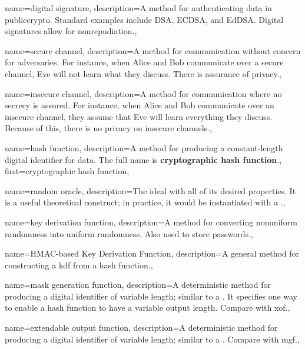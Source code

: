 {
    name={digital signature},
    description={A method for authenticating data in \gls{publiccrypto}.
        Standard examples include DSA, ECDSA, and EdDSA.
        Digital signatures allow for nonrepudiation.},
}

{
    name={secure channel},
    description={A method for communication without concern for adversaries.
        For instance, when Alice and Bob communicate over a secure channel,
        Eve will not learn what they discuss.
        There is assurance of privacy.},
}

{
    name={insecure channel},
    description={A method for communication where no secrecy is assured.
        For instance, when Alice and Bob communicate over an insecure channel,
        they assume that Eve will learn everything they discuss.
        Because of this, there is no privacy on insecure channels.},
}

{
    name={hash function},
    description={A method for producing a constant-length digital identifier
        for data.
        The full name is \textbf{cryptographic hash function}.},
    first={cryptographic hash function},
}

{
    name={random oracle},
    description={The ideal 
        with all of its desired properties.
        It is a useful theoretical construct;
        in practice, it would be instantiated with a
        .},
}

{
    name={key derivation function},
    description={A method for converting nonuniform randomness into
        uniform randomness.
        Also used to store passwords.},
}

{
    name={HMAC-based Key Derivation Function},
    description={A general method for constructing
        a \gls{kdf} from a \gls{hash function}.},
}

{
    name={mask generation function},
    description={A deterministic method for producing a digital identifier
        of variable length;
        similar to a .
        It specifies one way to enable a \gls{hash function}
        to have a variable output length.
        Compare with \gls{xof}.},
}

{
    name={extendable output function},
    description={A deterministic method for producing a digital identifier
        of variable length;
        similar to a .
        Compare with \gls{mgf}.},
}

